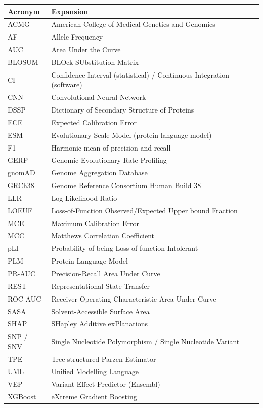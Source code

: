 \documentclass[11pt,a4paper,oneside]{report}
\begin{document}
\begin{tabularx}{\linewidth}{@{}l X@{}}
\toprule
\textbf{Acronym} & \textbf{Expansion} \\
\midrule
ACMG & American College of Medical Genetics and Genomics \\
AF & Allele Frequency \\
AUC & Area Under the Curve \\
BLOSUM & BLOck SUbstitution Matrix \\
CI & Confidence Interval (statistical) / Continuous Integration (software) \\
CNN & Convolutional Neural Network \\
DSSP & Dictionary of Secondary Structure of Proteins \\
ECE & Expected Calibration Error \\
ESM & Evolutionary-Scale Model (protein language model) \\
F1 & Harmonic mean of precision and recall \\
GERP & Genomic Evolutionary Rate Profiling \\
gnomAD & Genome Aggregation Database \\
GRCh38 & Genome Reference Consortium Human Build 38 \\
LLR & Log-Likelihood Ratio \\
LOEUF & Loss-of-Function Observed/Expected Upper bound Fraction \\
MCE & Maximum Calibration Error \\
MCC & Matthews Correlation Coefficient \\
pLI & Probability of being Loss-of-function Intolerant \\
PLM & Protein Language Model \\
PR-AUC & Precision-Recall Area Under Curve \\
REST & Representational State Transfer \\
ROC-AUC & Receiver Operating Characteristic Area Under Curve \\
SASA & Solvent-Accessible Surface Area \\
SHAP & SHapley Additive exPlanations \\
SNP / SNV & Single Nucleotide Polymorphism / Single Nucleotide Variant \\
TPE & Tree-structured Parzen Estimator \\
UML & Unified Modelling Language \\
VEP & Variant Effect Predictor (Ensembl) \\
XGBoost & eXtreme Gradient Boosting \\
\bottomrule
\end{tabularx}
\clearpage
\end{document}

